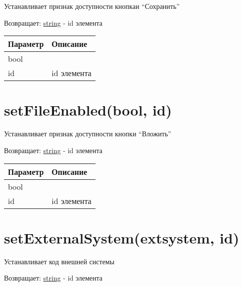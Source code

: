 Устанавливает признак доступности кнопкаи ``Сохранить''

Возвращает: \protect\hyperlink{string}{string} - id элемента

\begin{longtable}[]{@{}ll@{}}
\toprule
Параметр & Описание\tabularnewline
\midrule
\endhead
bool &\tabularnewline
id & id элемента\tabularnewline
\bottomrule
\end{longtable}

\hypertarget{setfileenabledbool-id-string}{%
\section{setFileEnabled(bool, id)}\label{setfileenabledbool-id-string}}

Устанавливает признак доступности кнопки ``Вложить''

Возвращает: \protect\hyperlink{string}{string} - id элемента

\begin{longtable}[]{@{}ll@{}}
\toprule
Параметр & Описание\tabularnewline
\midrule
\endhead
bool &\tabularnewline
id & id элемента\tabularnewline
\bottomrule
\end{longtable}

\hypertarget{setexternalsystemextsystem-id-string}{%
\section{setExternalSystem(extsystem, id)}\label{setexternalsystemextsystem-id-string}}

Устанавливает код внешней системы

Возвращает: \protect\hyperlink{string}{string} - id элемента

